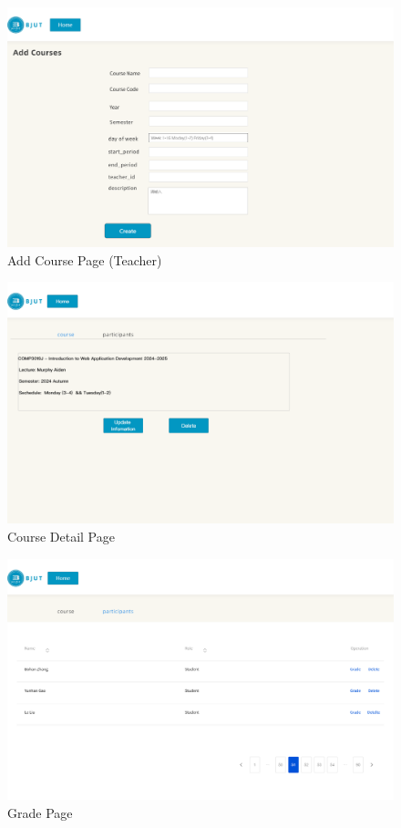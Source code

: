 \documentclass[12pt]{article}
\begin{document}
\begin{figure}[H]
    \centering
    \includegraphics[width=\textwidth]{mockups/teacher/addcourse.png}
    \caption{Add Course Page (Teacher)}
    \label{fig:teacher_addcourse_page}
\end{figure}

\begin{figure}[H]
    \centering
    \includegraphics[width=\textwidth]{mockups/teacher/coursedetail.png}
    \caption{Course Detail Page}
    \label{fig:teacher_coursedetail_page}
\end{figure}

\begin{figure}[H]
    \centering
    \includegraphics[width=\textwidth]{mockups/teacher/grade.png}
    \caption{Grade Page}
    \label{fig:teacher_grade_page}
\end{figure}
\end{document}
